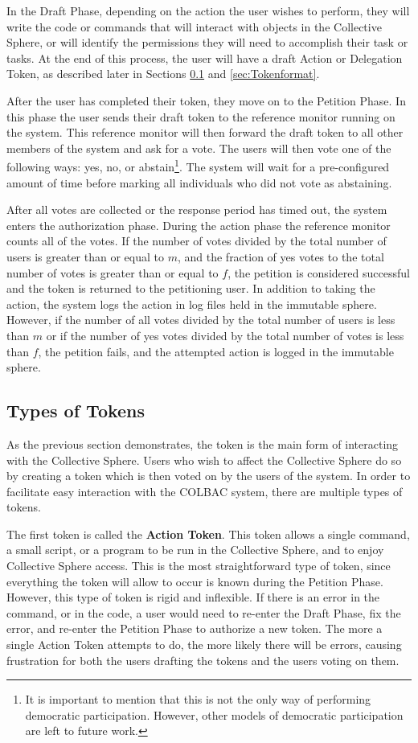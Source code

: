 In the Draft Phase, depending on the action the user wishes to perform, they
will write the code or commands that will interact with objects in the
Collective Sphere, or will identify the permissions they will need to accomplish
their task or tasks. At the end of this process, the user will have a draft
Action or Delegation Token, as described later in Sections \ref{sec:Tokentypes}
and \ref{sec:Tokenformat}.

After the user has completed their token, they move on to the Petition Phase. In
this phase the user sends their draft token to the reference monitor running on
the system. This reference monitor will then forward the draft token to all
other members of the system and ask for a vote. The users will then vote one of
the following ways: yes, no, or abstain\footnote{It is important to mention that
this is not the only way of performing democratic participation. However, other
models of democratic participation are left to future work.}. The system will
wait for a pre-configured amount of time before marking all individuals who did not
vote as abstaining.

After all votes are collected or the response period has timed out, the system
enters the authorization phase. During the action phase the reference monitor
counts all of the votes. If the number of votes divided by the total number of
users is greater than or equal to $m$, and the fraction of yes votes to the
total number of votes is greater than or equal to $f$, the petition is
considered successful and the token is returned to the petitioning user. In
addition to taking the action, the system logs the action in log files held in
the immutable sphere. However, if the number of all votes divided by the total
number of users is less than $m$ or if the number of yes votes divided by the
total number of votes is less than $f$, the petition fails, and the attempted
action is logged in the immutable sphere.

\subsection{Types of Tokens}
\label{sec:Tokentypes}
As the previous section demonstrates, the token is the main form of interacting
with the Collective Sphere. Users who wish to affect the Collective Sphere do
so by creating a token which is then voted on by the users of the system. In
order to facilitate easy interaction with the COLBAC system, there are multiple
types of tokens.

The first token is called the \textbf{Action Token}. This token allows a single
command, a small script, or a program to be run in the Collective Sphere, and to
enjoy Collective Sphere access. This is the most straightforward type of token,
since everything the token will allow to occur is known during the Petition
Phase. However, this type of token is rigid and inflexible. If there is an error
in the command, or in the code, a user would need to re-enter the Draft Phase,
fix the error, and re-enter the Petition Phase to authorize a new token. The
more a single Action Token attempts to do, the more likely there will be errors,
causing frustration for both the users drafting the tokens and the users voting
on them.

